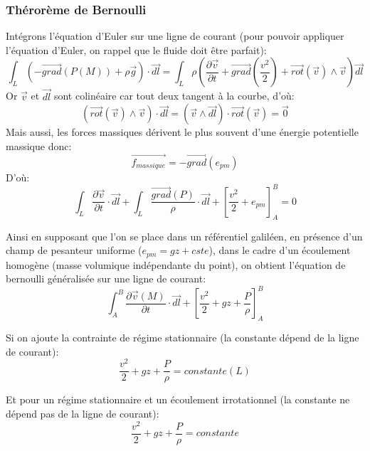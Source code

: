 \documentclass[10pt,a4paper]{article}
\begin{document}
\subsubsection{Thérorème de Bernoulli\cite{bernoulli}}
Intégrons l'équation d'Euler sur une ligne de courant (pour pouvoir appliquer l'équation d'Euler, on rappel que le fluide doit être parfait):
\begin{equation}
\int_{L}(-\overrightarrow{grad}(P(M)) + \rho\overrightarrow{g})\cdot\overrightarrow{dl} = \int_{L}\rho(\frac{\partial \overrightarrow{v}}{\partial t} + \overrightarrow{grad}(\frac{v^{2}}{2}) +\overrightarrow{rot}(\overrightarrow{v})\land\overrightarrow{v}) \overrightarrow{dl}
\end{equation}
Or $\overrightarrow{v}$ et $\overrightarrow{dl}$ sont colinéaire car tout deux tangent à la courbe, d'où:
\[ (\overrightarrow{rot}(\overrightarrow{v}) \land \overrightarrow{v})\cdot\overrightarrow{dl} = (\overrightarrow{v}\land\overrightarrow{dl})\cdot\overrightarrow{rot}(\overrightarrow{v}) = \overrightarrow{0} \]
Mais aussi, les forces massiques dérivent le plus souvent d'une énergie potentielle massique donc:
\[ \overrightarrow{f_{massique}} = -\overrightarrow{grad}(e_{pm})\]
D'où:
\begin{equation}
\int_{L} \frac{\partial\overrightarrow{v}}{\partial t}\cdot\overrightarrow{dl} +\int_{L} \frac{\overrightarrow{grad}(P)}{\rho}\cdot\overrightarrow{dl} + [\frac{v^{2}}{2} + e_{pm}]_{A}^{B}= 0
\end{equation}

Ainsi en supposant que l'on se place dans un référentiel galiléen, en présence d'un champ de pesanteur uniforme ($e_{pm} = gz + cste$), dans le cadre d'un écoulement homogène (masse volumique indépendante du point), on obtient l'équation de bernoulli généralisée sur une ligne de courant:
\begin{equation}
\int_{A}^{B} \frac{\partial \overrightarrow{v}(M)}{\partial t}\cdot\overrightarrow{dl} + [\frac{v^{2}}{2} +gz + \frac{P}{\rho}]_{A}^{B}
\end{equation}

Si on ajoute la contrainte de régime stationnaire (la constante dépend de la ligne de courant):
\begin{equation}
\frac{v^{2}}{2}  + g z + \frac{P}{\rho} = constante(L)
\label{eq:bernoulli}
\end{equation}

Et pour un régime stationnaire et un écoulement irrotationnel (la constante ne dépend pas de la ligne de courant):
\begin{equation}
\frac{v^{2}}{2}  + g z + \frac{P}{\rho} = constante
\end{equation}
\end{document}
